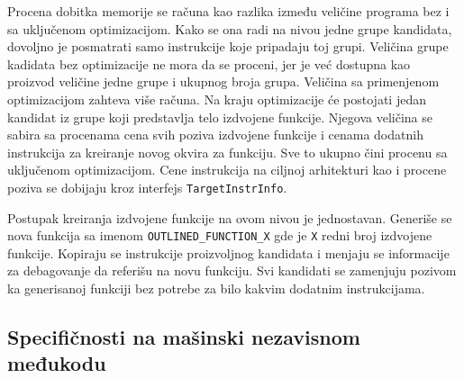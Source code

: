 \documentclass[12pt,oneside]{memoir}
\begin{document}
Procena dobitka memorije se računa kao razlika između veličine programa bez i sa uključenom optimizacijom.
Kako se ona radi na nivou jedne grupe kandidata, dovoljno je posmatrati samo instrukcije koje pripadaju toj grupi. %
Veličina grupe kadidata bez optimizacije ne mora da se proceni, jer je već dostupna kao proizvod veličine jedne grupe i ukupnog broja grupa.
Veličina sa primenjenom optimizacijom zahteva više računa.
Na kraju optimizacije će postojati jedan kandidat iz grupe koji predstavlja telo izdvojene funkcije.
Njegova veličina se sabira sa procenama cena svih poziva izdvojene funkcije i cenama dodatnih instrukcija za kreiranje novog okvira za funkciju.
Sve to ukupno čini procenu sa uključenom optimizacijom.
Cene instrukcija na ciljnoj arhitekturi kao i procene poziva se dobijaju kroz interfejs \verb|TargetInstrInfo|.

Postupak kreiranja izdvojene funkcije na ovom nivou je jednostavan.
Generiše se nova funkcija sa imenom \verb|OUTLINED_FUNCTION_X| gde je \verb|X| redni broj izdvojene funkcije.
Kopiraju se instrukcije proizvoljnog kandidata i menjaju se informacije za debagovanje da referišu na novu funkciju.
Svi kandidati se zamenjuju pozivom ka generisanoj funkciji bez potrebe za bilo kakvim dodatnim instrukcijama.

\subsection{Specifičnosti na mašinski nezavisnom međukodu}

\end{document}

